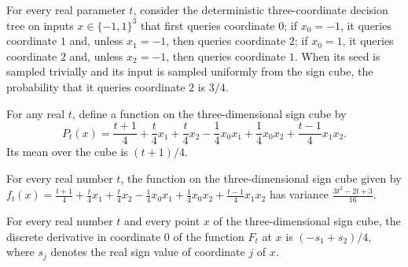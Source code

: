 \begin{theorem}
\label{FABL.osssCounterexampleRandomizedTreeAt_queryProbability_two}
\leanok
{}
For every real parameter $t$, consider the deterministic three-coordinate decision tree
on inputs $x\in\{-1,1\}^3$ that first queries coordinate $0$; if $x_0=-1$, it queries
coordinate $1$ and, unless $x_1=-1$, then queries coordinate $2$; if $x_0=1$, it queries
coordinate $2$ and, unless $x_2=-1$, then queries coordinate $1$. When its seed is
sampled trivially and its input is sampled uniformly from the sign cube, the probability
that it queries coordinate $2$ is $3/4$.
\end{theorem}

\begin{theorem}
\label{FABL.mean_osssCounterexampleAt}
\leanok
{}
For any real $t$, define a function on the three-dimensional sign cube by
\[P_t(x)=\frac{t+1}{4}+\frac{t}{4}x_1+\frac{t}{4}x_2-\frac14 x_0x_1+\frac14 x_0x_2+\frac{t-1}{4}x_1x_2.\]
Its mean over the cube is $(t+1)/4$.
\end{theorem}

\begin{theorem}
\label{FABL.variance_osssCounterexampleAt}
\leanok
{}
For every real number $t$, the function on the three-dimensional sign cube given by
$f_t(x)=\frac{t+1}{4}+\frac{t}{4}x_1+\frac{t}{4}x_2-\frac14x_0x_1+\frac14x_0x_2+\frac{t-1}{4}x_1x_2$
has variance $\frac{3t^2-2t+3}{16}$.
\end{theorem}

\begin{theorem}
\label{FABL.discreteDerivative_osssCounterexampleAt_zero}
\leanok
{}
For every real number $t$ and every point $x$ of the three-dimensional sign cube, the
discrete derivative in coordinate $0$ of the function $F_t$ at $x$ is $(-s_1+s_2)/4$,
where $s_j$ denotes the real sign value of coordinate $j$ of $x$.
\end{theorem}

